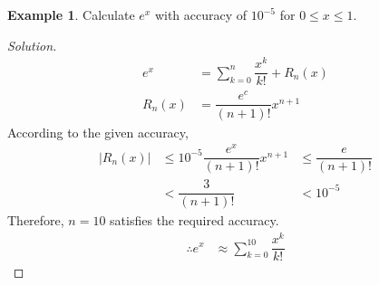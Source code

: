 \documentclass[fleqn, 12pt]{article}
\theoremstyle{definition}
\newtheorem{example}{Example}
\theoremstyle{theorem}
\newenvironment{solution}
{\begin{proof}[Solution]\let\qed\relax}
	{\end{proof}}
\begin{document}
\begin{example}
	Calculate $e^x$ with accuracy of $10^{-5}$ for $0 \leq x \leq 1$.
\end{example}

\begin{solution}
	\begin{align*}
		e^x &= \sum_{k = 0}^{n} \dfrac{x^k}{k!} + R_n (x)\\
		R_n (x) &= \dfrac{e^c}{(n + 1)!} x^{n + 1}
	\end{align*}
	According to the given accuracy, 
	\begin{align*}
		|R_n (x)| &\leq 10^{-5}
		\dfrac{e^x}{(n + 1)!} x^{n + 1} &\leq \dfrac{e}{(n + 1)!}\\
		&< \dfrac{3}{(n + 1)!}
		&< 10^{-5}
	\end{align*}
	Therefore, $n = 10$ satisfies the required accuracy.
	\begin{align*}
	\therefore e^x &\approx \sum_{k = 0}^{10} \dfrac{x^k}{k!}
	\end{align*}
\end{solution}
\end{document}
